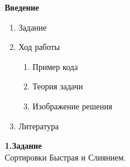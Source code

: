 \documentclass[a4paper, 12pt]{article}
\begin{document}
\begin{flushleft}
\textbf{{\Large Введение}}\\
\begin{enumerate}
\item Задание
\item Ход работы
\begin{enumerate}
    \item Пример кода
    \item Теория задачи
    \item Изображение решения
\end{enumerate}
\item Литература
\end{enumerate}
\end{flushleft}
\newpage
\begin{flushleft}
\textbf{{\large 1.Задание}}\\
Сортировки Быстрая и Слиянием.
\end{flushleft}
\end{document}

